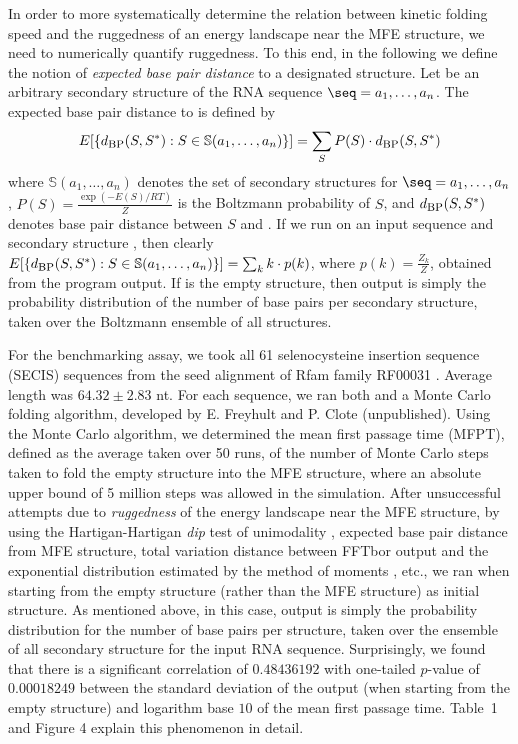 In order to more systematically determine the relation between kinetic
folding speed and the ruggedness of an energy landscape near the MFE structure,
we need to numerically quantify ruggedness. To this end, in the following
we define the notion of {\em expected base pair distance} to a designated
structure. Let \strSt be an arbitrary secondary structure of the RNA sequence
$\seq = a_1,\dots,a_n$.
The expected base pair distance to \strSt is defined by
\begin{eqnarray}
\label{eq:expectedBasePairDist}
E[ \{ d_{\mbox{\sc bp}}(S,S^*): S \in \mathbb{S}(a_1,\ldots,a_n)\} ]  =
\sum_{S} P(S) \cdot d_{\mbox{\sc bp}}(S,S^*)
\end{eqnarray}
where
$\mathbb{S}(a_1,\ldots,a_n)$ denotes the set of secondary structures for
$\seq = a_1,\dots,a_n$, $P(S) = \frac{\exp(-E(S)/RT)}{Z}$ is the Boltzmann
probability of $S$, and
$d_{\mbox{\sc bp}}(S,S^*)$ denotes base pair distance between $S$ and \strSt.
If we run \fftbor on an input sequence \seq and secondary structure
\strSt, then clearly
$E[ \{ d_{\mbox{\sc bp}}(S,S^*): S \in \mathbb{S}(a_1,\ldots,a_n)\} ]  =
\sum_{k} k \cdot p(k)$, where $p(k)=\frac{Z_k}{Z}$, obtained from the
program output.  If \strSt is the empty structure, then \fftbor output
is simply the probability distribution of the number of base pairs per
secondary structure, taken over the Boltzmann ensemble of all structures.

For the benchmarking assay, we took all 61 selenocysteine insertion sequence
(SECIS) sequences from the seed alignment of Rfam family RF00031
\cite{Gardner.nar11}. Average length was $64.32 \pm 2.83$ nt.
For each sequence, we ran both \fftbor and a Monte Carlo
folding algorithm, developed by E. Freyhult and P. Clote (unpublished).
Using the Monte Carlo algorithm, we
determined the mean first passage time (MFPT), defined as the average
taken over 50 runs, of the number of Monte Carlo steps taken to fold
the empty structure into the MFE structure, where an absolute upper bound
of 5 million steps was allowed in the simulation.  After unsuccessful
attempts due to {\em ruggedness} of the energy landscape near the MFE structure,
by using the Hartigan-Hartigan {\em dip} test of unimodality
\cite{hartiganDipTest},
expected base pair distance from MFE structure, total variation distance
between FFTbor output and the exponential distribution estimated by
the method of moments \cite{zar:biostatistics}, etc.,
we ran \fftbor
when starting from the empty structure (rather than the MFE structure)
as initial structure.
As mentioned above, in this case, \fftbor output is simply
the probability distribution
for the number of base pairs per structure, taken over the ensemble
of all secondary structure for the input RNA
sequence. Surprisingly, we found that there is a significant
correlation of  $0.48436192$ with one-tailed
$p$-value of $0.00018249$ between the
standard deviation of the \fftbor output (when starting from the
empty structure) and logarithm base $10$ of the mean first passage time.
Table~1 and Figure 4 explain this phenomenon in detail.

